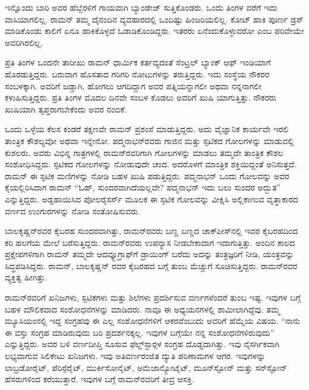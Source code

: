 ಇನ್ನೊಂದು ಬಾರಿ ಅವರ ಹೆಬ್ಬೆರಳಿಗೆ ಗಾಯವಾಗಿ ಬ್ಯಾಂಡೇಜ್ ಸುತ್ತಿಕೊಂಡರು. ಒಂದು ತಿಂಗಳ ವರೆಗೆ ಇದು ವಾಸಿಯಾಗಲಿಲ್ಲ. ರಾಮನ್ ತಮ್ಮ ದೈನಂದಿನ ವ್ಯವಹಾರದಲ್ಲಿ ಒಂದಿಷ್ಟು ಹಿಂಜರಿಯಲಿಲ್ಲ. ಕೋಟ್ ಹಾಕಿ ಪೂರ್ಣ ಡ್ರಸ್ ಮಾಡಿಕೊಂಡು ಕಾಲಿಗೆ ಏನೂ ಹಾಕಿಕೊಳ್ಳದೆ ಓಡಾಡಿಕೊಂಡಿದ್ದರು. ಇತರರು ಏನೆಂದುಕೊಳ್ಳುವರೋ ಎಂಬ ಪರಿವೇಯೇ ಅವರಿಗಿರಲಿಲ್ಲ.

ಪ್ರತಿ ತಿಂಗಳ ಒಂದನೇ ತಾರೀಖು ರಾಮನ್ ಧಾರ್ಮಿಕ ಕರ್ತವ್ಯದಂತೆ ಸೆಂಟ್ರಲ್ ಬ್ಯಾಂಕ್ ಆಫ್ ಇಂಡಿಯಾಗೆ ಹೊರಡುತ್ತಿದ್ದರು. ಬರುವಾಗ ಹೊಸತಾದ ಗರಿಗರಿ ನೋಟುಗಳನ್ನು ತರುತ್ತಿದ್ದರು. ಇದು ಸಂಸ್ಥೆಯ ನೌಕರರ ಸಂಬಳಕ್ಕಾಗಿ. ಅವರಿಗೆ ಜಡ್ಡಾಗಿ, ಹೋಗಲು ಆಗದಿದ್ದಾಗ ಅವರ ಪತ್ನಿಯನ್ನಾಗಲೀ ಅಥವಾ ನನ್ನನಾಗಲೀ ಕಳುಹಿಸುತ್ತಿದ್ದರು. ಪ್ರತಿ ತಿಂಗಳ ಮೊದಲ ದಿನವೇ ಸಂಬಳ ಕೊಡಲು ಅವರಿಗೆ ಖುಷಿ ಯಾಗುತ್ತಿತ್ತು. ನೌಕರರು ಖುಷಿಯಾಗಿ ತೃಪ್ತರಾಗಬೇಕೆಂದು ಅವರ ನಂಬಿಕೆ.

ಒಂದು ಒಳ್ಳೆಯ ಕೆಲಸ ಕಂಡರೆ ತಕ್ಷಣವೇ ರಾಮನ್ ಪ್ರಶಂಸೆ ಮಾಡುತ್ತಿದ್ದರು. ಅದು ವೈಜ್ಞಾನಿಕ ಕಾರ್ಯವೇ ಇರಲಿ ತಾಂತ್ರಿಕ ಕೌಶಲ್ಯವೋ ಅಥವಾ ಇನ್ನೇನೋ. ಪದ್ಮನಾಭನ್‍ರವರು ಗಾಜಿನ ಮತ್ತು ಸ್ಫಟಿಕದ ಗೋಲಗಳನ್ನು ಮಾಡುವಲ್ಲಿ ಕುಶಲರು. ಅವರು ವಿಭಿನ್ನ ಗಾತ್ರಗಳಲ್ಲಿ ರಾಮನ್‍ರವರಿಗಾಗಿ ಗೋಲಗಳನ್ನು ಮಾಡಲು ತಮ್ಮದೇ ತಾಂತ್ರಿಕ ಕೌಶಲ ಸಂಶೋಧಿಸಿದ್ದರು. ಸ್ಫಟಿಕದ ಗೋಲಗಳನ್ನು ನೋಡುವುದೇ ಚಂದ. ಅದರೊಳಗೆ ಮಾಂತ್ರಿಕ ಶಕ್ತಿಯಿದ್ದಂತೆ ಅನಿಸುತ್ತದೆ. ರಾಮನ್ ಈ ಸ್ಫಟಿಕ ಮಣಿಗಳನ್ನು ನೋಡಿ ಬಹಳ ಖುಷಿ ಪಡುತ್ತಿದ್ದರು. ಪದ್ಮನಾಭನ್ ಒಂದು ಗೋಲವನ್ನು ಅವರ ಕೈಯಲ್ಲಿರಿಸಿದಾಗ ರಾಮನ್ “ಓಹ್, ಸುಂದರವಾಗಿದೆಯಲ್ಲವೇ? ಪದ್ಮನಾಭನ್ ಇದು ಬಲು ಸುಂದರ ಅದ್ಭುತ” ಎನ್ನುತ್ತಿದ್ದರು. ಅಡ್ಡಹಾಯಿಸಿದ ಪೋಲರೈಸರ್ಸ್ ಮೂಲಕ ಈ ಸ್ಫಟಿಕ ಗೋಲವನ್ನು ವೀಕ್ಷಿಸಿ ಅಲ್ಲಿಕಾಣುವ ವೃತ್ತಾಕಾರದ ವರ್ಣದ ಉಂಗುರಗಳನ್ನು ನೋಡಿ ಸಂತೋಷಿಸುವರು.

ಬಾಲಕೃಷ್ಣನ್‍ರವರ ಕೈಬರಹ ಸುಂದರವಾಗಿತ್ತು, ರಾಮನ್‍ರವರು ಬಣ್ಣ ಬಣ್ಣದ ಚಾಕ್‍ಪೀಸ್‍ನಲ್ಲಿ ಇವರ ಕೈಬರಹದಿಂದ ಕರಿ ಹಲಗೆಯ ಮೇಲೆ ಬರೆಸುತ್ತಿದ್ದರು. ರಾಮನ್‍ರವರು ಉಪನ್ಯಾಸ ನೀಡಬೇಕಾದಾಗ ಇದಾಗುತ್ತಿತ್ತು. ಅಂದಿನ ಕಾಲದ ಪ್ರಕ್ಷೇಪಗಳಿಗಾಗಿ ರಾಮನ್ ತಮ್ಮದೇ ಆದ\break ವ್ಯೂಗ್ರಾಫ್‍ಗೆ ಡ್ರಾಯಿಂಗ್ ಬರೆದು ಅದನ್ನು ತಂತ್ರಜ್ಞರಿಗೆ ನೀಡಿ, ಯಂತ್ರವನ್ನು ಸಿದ್ಧಪಡಿಸಿದ್ದರು. ರಾಮನ್, ಬಾಲಕೃಷ್ಣನ್ ರವರ ಕೈಬರಹದ ಬಗ್ಗೆ ತುಂಬ ಮೆಚ್ಚುಗೆ ಸೂಚಿಸುತ್ತಿದ್ದರು. ರಾಮನ್‍ರವರ ವ್ಯಕ್ತಿತ್ವ ಹೀಗಿತ್ತು.



ರಾಮನ್‍ರವರಿಗೆ ಖನಿಜಗಳು, ಸ್ಫಟಿಕಗಳು ಮತ್ತು ಶಿಲೆಗಳು ಪ್ರದರ್ಶಿಸುವ ವರ್ಣಗಳೆಂದರೆ ತುಂಬ ಇಷ್ಟ. ಇವುಗಳ ಬಗ್ಗೆ ಬಹಳ ಮೌಲಿಕವಾದ ಸಂಶೋಧನೆಗಳನ್ನು ಮಾಡಿದರು. ನಾವೂ ಈ ಅಧ್ಯಯನಗಳಲ್ಲಿ ಶಾಮೀಲಾಗಿದ್ದೆವು. ತಮ್ಮ ಮ್ಯೂಸಿಯಂನಲ್ಲಿ ಇದ್ದ ಸಂಗ್ರಹವು ಈ ಎಲ್ಲ ಸಂಶೋಧನೆಗಳಿಗೆ ಆಕರವೆಂಬುದು ಅವರಿಗೆ ಹೆಮ್ಮೆಯ ವಿಷಯ. “ನಾನು ಈ ವಸ್ತು ಸಂಗ್ರಹ ಮಾಡಿರುವುದು ಬರಿ ಪ್ರದರ್ಶನಕ್ಕಲ್ಲ. ಇವುಗಳ ಬಗ್ಗೆಯೇ ನನ್ನ ಸಂಶೋಧನೆಗಳಿರುವುದು” ಎನ್ನುತ್ತಿದ್ದರು. ಅವರ ಬಳಿ ವರ್ಣದೀಪ್ತಿ ಸೂಸುವ ಫೆಲ್ಡ್‌ಸ್ಟಾರ್‍ಗಳ ಸಂಗ್ರಹ ದೊಡ್ಡದಾಗಿತ್ತು. ಇವು ನೈಸರ್ಗಿಕವಾಗಿ ಲಭ್ಯವಾಗುವ ಸಿಲಿಕೇಟು ಖನಿಜಗಳು. ಇವು ಅತಿವರ್ಣರಂಜಿತ ದ್ಯುತಿ ಪರಿಣಾಮಗಳ ಆಗರ. ಇವುಗಳನ್ನು ಲಾಬ್ರಡೋರೈಟ್, ಪೆರಿಸ್ಪೆರೈಟ್, ಮುರ್ಕಿಸೋನೈಟ್, ಅಮೆಜಾನ್ಯೋಟೈಟ್, ಮೂನ್‍ಸ್ಟೋನ್ ಮತ್ತು ಸನ್‍ಸ್ಟೋನ್ ಹೆಸರುಗಳಿಂದ ಕರೆಯುತ್ತಾರೆ. ಇವುಗಳ ಬಗ್ಗೆ ರಾಮನ್‍ರವರಿಗೆ ತೀವ್ರ ಆಸಕ್ತಿ.

